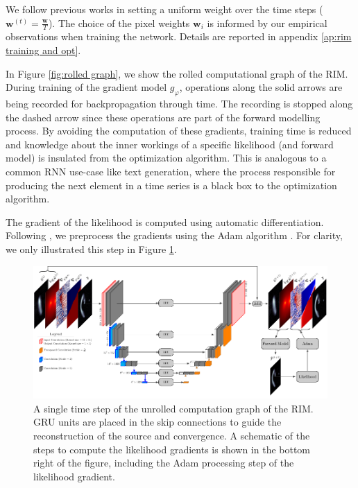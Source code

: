We follow previous works in setting a uniform weight over the time 
steps ($\mathbf{w}^{(t)} = \frac{\mathbf{w}}{T}$). 
The choice of the pixel weights $\mathbf{w}_i$ is informed 
by our empirical observations when training the network. Details 
are reported in appendix \ref{ap:rim training and opt}.

In Figure \ref{fig:rolled graph}, we show the rolled computational graph of the 
RIM. During training of the gradient model $g_\varphi$, operations along the solid arrows are being 
recorded for backpropagation through time. 
The recording is stopped along the dashed arrow since these operations 
are part of the forward modelling process.
By avoiding the computation of these gradients, training time is reduced and 
knowledge about the inner workings  
of a specific likelihood (and forward model) is insulated from the optimization algorithm.
This is analogous to a common RNN use-case like text generation, where the process responsible 
for producing the next element in a time series is a black box to the optimization 
algorithm. 

The gradient of the likelihood is computed using automatic differentiation. Following 
\citep{Modi2021}, we preprocess the gradients using the Adam algorithm \citep{Kingma2013}. 
For clarity, we only illustrated this step in Figure \ref{fig:unet}. 

\begin{figure}[ht!]
        \centering
        \includegraphics[width=\textwidth]{figures/unet_architecture.pdf}
        \caption{
A single time step of the unrolled computation graph of the RIM.
GRU units are placed in the skip connections to guide the 
reconstruction of the source and convergence. A schematic of the steps to compute 
the likelihood gradients is shown in the bottom right of the figure, including the 
Adam processing step of the likelihood gradient.}
        \label{fig:unet}
\end{figure}

